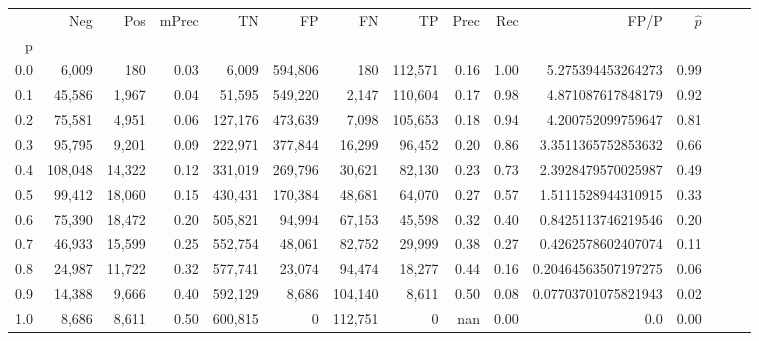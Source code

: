 \begin{tabular}{rrrrrrrrrrrrrrr}
\toprule
{} &      Neg &     Pos & mPrec &       TN &       FP &       FN &       TP &  Prec &   Rec &                 FP/P & $\hat{p}$ \\
p   &          &         &       &          &          &          &          &       &       &                      &           \\
\midrule
0.0 &    6,009 &     180 &  0.03 &    6,009 &  594,806 &      180 &  112,571 &  0.16 &  1.00 &    5.275394453264273 &      0.99 \\
0.1 &   45,586 &   1,967 &  0.04 &   51,595 &  549,220 &    2,147 &  110,604 &  0.17 &  0.98 &    4.871087617848179 &      0.92 \\
0.2 &   75,581 &   4,951 &  0.06 &  127,176 &  473,639 &    7,098 &  105,653 &  0.18 &  0.94 &    4.200752099759647 &      0.81 \\
0.3 &   95,795 &   9,201 &  0.09 &  222,971 &  377,844 &   16,299 &   96,452 &  0.20 &  0.86 &   3.3511365752853632 &      0.66 \\
0.4 &  108,048 &  14,322 &  0.12 &  331,019 &  269,796 &   30,621 &   82,130 &  0.23 &  0.73 &   2.3928479570025987 &      0.49 \\
0.5 &   99,412 &  18,060 &  0.15 &  430,431 &  170,384 &   48,681 &   64,070 &  0.27 &  0.57 &   1.5111528944310915 &      0.33 \\
0.6 &   75,390 &  18,472 &  0.20 &  505,821 &   94,994 &   67,153 &   45,598 &  0.32 &  0.40 &   0.8425113746219546 &      0.20 \\
0.7 &   46,933 &  15,599 &  0.25 &  552,754 &   48,061 &   82,752 &   29,999 &  0.38 &  0.27 &   0.4262578602407074 &      0.11 \\
0.8 &   24,987 &  11,722 &  0.32 &  577,741 &   23,074 &   94,474 &   18,277 &  0.44 &  0.16 &  0.20464563507197275 &      0.06 \\
0.9 &   14,388 &   9,666 &  0.40 &  592,129 &    8,686 &  104,140 &    8,611 &  0.50 &  0.08 &  0.07703701075821943 &      0.02 \\
1.0 &    8,686 &   8,611 &  0.50 &  600,815 &        0 &  112,751 &        0 &   nan &  0.00 &                  0.0 &      0.00 \\
\bottomrule
\end{tabular}

